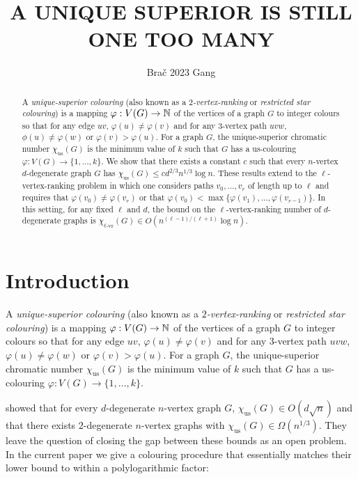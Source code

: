 \documentclass{patmorin}
\title{\MakeUppercase{A Unique Superior is Still One Too Many}}
\author{Bra\v{c} 2023 Gang}
\newcommand{\defin}[1]{\emph{\color{brightmaroon}#1}}
\newcommand{\rn}[1]{\chi_{\operatorname{#1-vr}}}
\newcommand{\trn}{\chi_{\mathrm{us}}}
\newcommand{\lrn}{\rn{\ell}}
\begin{document}
\maketitle

\begin{abstract}
  A \defin{unique-superior colouring} (also known as a \defin{$2$-vertex-ranking} or \defin{restricted star colouring}) is a mapping $\varphi:V(G)\to\mathbb{N}$ of the vertices of a graph $G$ to integer colours so that for any edge $uv$, $\varphi(u)\neq \varphi(v)$ and for any $3$-vertex path $uvw$, $\phi(u)\neq\varphi(w)$ or $\varphi(v)>\varphi(u)$.  For a graph $G$, the unique-superior chromatic number $\trn(G)$ is the minimum value of $k$ such that $G$ has a us-colouring $\varphi:V(G)\to\{1,\ldots,k\}$.  We show that there exists a constant $c$ such that every $n$-vertex $d$-degenerate graph $G$ has $\trn(G) \le cd^{2/3} n^{1/3}\log n$.  These results extend to the $\ell$-vertex-ranking problem in which one considers paths $v_0,\ldots,v_r$ of length up to $\ell$ and requires that $\varphi(v_0)\neq\varphi(v_r)$ or that $\varphi(v_0)<\max\{\varphi(v_1),\ldots,\varphi(v_{r-1})\}$.  In this setting, for any fixed $\ell$ and $d$, the bound on the $\ell$-vertex-ranking number of $d$-degenerate graphs is $\lrn(G)\in O(n^{(\ell-1)/(\ell+1)}\log n)$.
\end{abstract}


%



\section{Introduction}

A \defin{unique-superior colouring} (also known as a \defin{$2$-vertex-ranking} or \defin{restricted star colouring}) is a mapping $\varphi:V(G)\to\mathbb{N}$ of the vertices of a graph $G$ to integer colours so that for any edge $uv$, $\varphi(u)\neq \varphi(v)$ and for any $3$-vertex path $uvw$, $\varphi(u)\neq\varphi(w)$ or $\varphi(v)>\varphi(u)$.  For a graph $G$, the unique-superior chromatic number $\trn(G)$ is the minimum value of $k$ such that $G$ has a us-colouring $\varphi:V(G)\to\{1,\ldots,k\}$.

\citet{karpas.neiman.ea:on} showed that for every $d$-degenerate $n$-vertex graph $G$, $\trn(G)\in O(d\sqrt{n})$ and that there exists $2$-degenerate $n$-vertex graphs with $\trn(G)\in\Omega(n^{1/3})$.  They leave the question of closing the gap between these bounds as an open problem. In the current paper we give a colouring procedure that essentially matches their lower bound to within a polylogarithmic factor:
\end{document}
